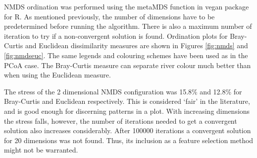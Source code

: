 NMDS ordination was performed using the metaMDS function in vegan \cite{oksanen_vegan_nodate} package for R. As mentioned previously, the number of dimensions have to be predetermined before running the algorithm. There is also a maximum number of iteration to try if a non-convergent solution is found. Ordination plots for Bray-Curtis and Euclidean dissimilarity measures are shown in Figures \ref{fig:nmds} and \ref{fig:nmdseuc}. The same legends and colouring schemes have been used as in the PCoA case. The Bray-Curtis measure can separate river colour much better than when using the Euclidean measure. 


The stress of the 2 dimensional NMDS configuration was 15.8\% and 12.8\% for Bray-Curtis and Euclidean respectively. This is considered `fair' in the literature, and is good enough for discerning patterns in a plot. With increasing dimensions the stress falls, however, the number of iterations needed to get a convergent solution also increases considerably. After 100000 iterations a convergent solution for 20 dimensions was not found. Thus, its inclusion as a feature selection method might not be warranted. 

